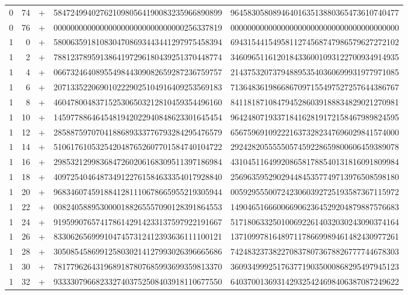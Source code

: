 \begin{longtable}{rrrll}
0 & 74 & + & 5847249940276210980564190083235966890899 & 9645830580894640163513880365473610740477 \\
0 & 76 & + & 0000000000000000000000000000000256337819 & 0000000000000000000000000000000000000000 \\
1 & 0 & + & 5800635918108304708693443441297975458394 & 6943154415495811274568747986579627272102 \\
1 & 2 & + & 7881237895913864197296180439251370448774 & 3460965116120184336001093122700934914935 \\
1 & 4 & + & 0667324640895549844309082659287236759757 & 2143753207379488953540360699931977971085 \\
1 & 6 & + & 2071335220690102229025104916409253569183 & 7136483619866867097155497527257644386767 \\
1 & 8 & + & 4604780048371525306503212810459354496160 & 8411818710847945286039188834829021270981 \\
1 & 10 & + & 1459778864645481942022940848623301645454 & 9642480719337184162819172158467989824595 \\
1 & 12 & + & 2858875970704188689333776793284295476579 & 6567596910922216373282347696029841574000 \\
1 & 14 & + & 5106176105325420487652607701584740104722 & 2924282055555057459228659800606459389078 \\
1 & 16 & + & 2985321299836847260206168309511397186984 & 4310451164992086581788540131816091809984 \\
1 & 18 & + & 4097254046487349122761584633354017928840 & 2569635952902944845357749713976508598180 \\
1 & 20 & + & 9683460745918841281110678665955219305944 & 0059295550072423060392725193587367115972 \\
1 & 22 & + & 0082405889530000188265557090128391864553 & 1490465166600669062364529204879887576683 \\
1 & 24 & + & 9195990765741786142914233137597922191667 & 5171806332501006922614032030243090374164 \\
1 & 26 & + & 8330626569991047457312412393636111100121 & 1371099781648971178669989461482430977261 \\
1 & 28 & + & 3050854586991258030214127993026396665686 & 7424832373822708378073678826777744678303 \\
1 & 30 & + & 7817796264319689187807685993699359813370 & 3609349992517637719035000868295497945123 \\
1 & 32 & + & 9333307966823327403752508403918110677550 & 6403700136931429325424698406387087249622 \\

\end{longtable}
